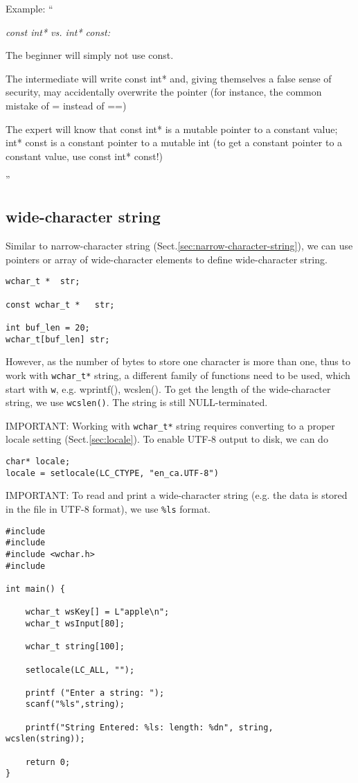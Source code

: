 Example:
``{\it const int* vs. int* const: 

The beginner will simply not use const.

The intermediate will write const int* and, giving themselves a false sense of
security, may accidentally overwrite the pointer (for instance, the common
mistake of = instead of ==) 

The expert will know that const int* is a mutable pointer to a constant value;
int* const is a constant pointer to a mutable int (to get a constant pointer to
a constant value, use const int* const!)}''  



\subsection{ wide-character string}
\label{sec:wide-character-string}
\label{sec:wchar*}

Similar to narrow-character string (Sect.\ref{sec:narrow-character-string}), we
can use pointers or array of wide-character elements to define wide-character
string.
\begin{verbatim}
wchar_t *  str;

const wchar_t *   str;

int buf_len = 20;
wchar_t[buf_len] str;
\end{verbatim}

However, as the number of bytes to store one character is
more than one, thus to work with \verb!wchar_t*! string, a different family of
functions need to be used, which start with \verb!w!, e.g. wprintf(), wcslen().
To get the length of the wide-character string, we use
\verb!wcslen()!. The string is still NULL-terminated.

IMPORTANT: Working with \verb!wchar_t*! string requires converting to a proper
locale setting (Sect.\ref{sec:locale}). To enable UTF-8 output to disk, we can
do
\begin{verbatim}
char* locale;
locale = setlocale(LC_CTYPE, "en_ca.UTF-8")
\end{verbatim}

IMPORTANT: To read and print a wide-character string (e.g. the data is
stored in the file in UTF-8 format), we use \verb!%ls! format. 

\begin{verbatim}
#include 
#include 
#include <wchar.h>
#include 

int main() {

    wchar_t wsKey[] = L"apple\n";
    wchar_t wsInput[80];
  
    wchar_t string[100];

    setlocale(LC_ALL, "");

    printf ("Enter a string: ");
    scanf("%ls",string);

    printf("String Entered: %ls: length: %dn", string, wcslen(string));

    return 0;
}
\end{verbatim}


